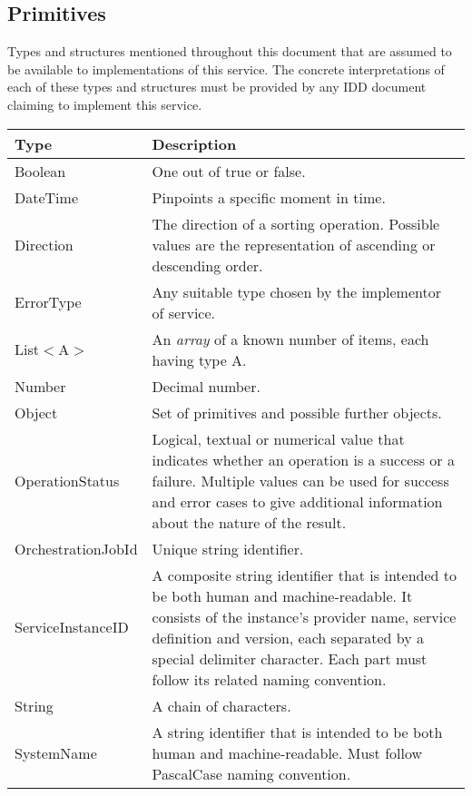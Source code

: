 \documentclass[a4paper]{arrowhead}
\newcommand{\pdef}[1]{{\textcolor{ArrowheadGrey}{#1\label{sec:model:primitives:#1}\label{sec:model:primitives:#1s}\label{sec:model:primitives:#1es}}}}
\begin{document}
\clearpage

\subsection{Primitives}
\label{sec:model:primitives}

Types and structures mentioned throughout this document that are assumed to be available to implementations of this service.
The concrete interpretations of each of these types and structures must be provided by any IDD document claiming to implement this service.


\begin{table}[ht!]
\begin{tabularx}{\textwidth}{| p{4.3cm} | X |} \hline
\rowcolor{gray!33} Type & Description \\ \hline
\pdef{Boolean}          & One out of true or false. \\ \hline
\pdef{DateTime}         & Pinpoints a specific moment in time. \\ \hline
\pdef{Direction}        & The direction of a sorting operation. Possible values are the representation of ascending or descending order. \\ \hline
\pdef{ErrorType}        & Any suitable type chosen by the implementor of service. \\ \hline
\pdef{List}$<$A$>$      & An \textit{array} of a known number of items, each having type A. \\ \hline
\pdef{Number}           & Decimal number. \\ \hline
\pdef{Object}           & Set of primitives and possible further objects. \\ \hline
\pdef{OperationStatus}  & Logical, textual or numerical value that indicates whether an operation is a success or a failure. Multiple values can be used for success and error cases to give additional information about the nature of the result. \\ \hline
\pdef{OrchestrationJobId} & Unique string identifier. \\ \hline
\pdef{ServiceInstanceID} & A composite string identifier that is intended to be both human and machine-readable. It consists of the instance’s provider name, service definition and version, each separated by a special delimiter character. Each part must follow its related naming convention. \\ \hline
\pdef{String}           & A chain of characters. \\ \hline
\pdef{SystemName}             & A string identifier that is intended to be both human and machine-readable. Must follow PascalCase naming convention. \\ \hline
\end{tabularx}
\end{table}
\end{document}
